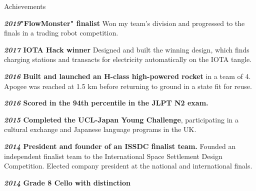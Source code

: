 \documentclass[10pt]{resume} %
\begin{document}
\begin{rSection}{Achievements}
    \item \textbf{\textit{2019}{"FlowMonster" finalist}} Won my team's division
      and progressed to the finals in a trading robot competition.
    \item \textbf{\textit{2017} IOTA Hack winner}
      Designed and built the winning design, which finds charging stations and
      transacts for electricity automatically on the IOTA tangle.
    \item \textbf{\textit{2016} Built and launched an H-class high-powered
      rocket} in a team of 4. Apogee was reached at 1.5 km before returning to
      ground in a state fit for reuse.
    \item \textbf{\textit{2016} Scored in the 94th percentile in the JLPT N2
      exam.}
    \item \textbf{\textit{2015} Completed the UCL-Japan Young Challenge},
    participating in a cultural exchange and Japanese language programs in the
    UK.
    \item \textbf{\textit{2014} President and founder of an ISSDC finalist
      team.}
    Founded an independent finalist team to the International Space Settlement
    Design Competition. Elected company president at the national and
    international finals.
     \item \textbf{\textit{2014} Grade 8 Cello with distinction}
\end{rSection}

\end{document}
